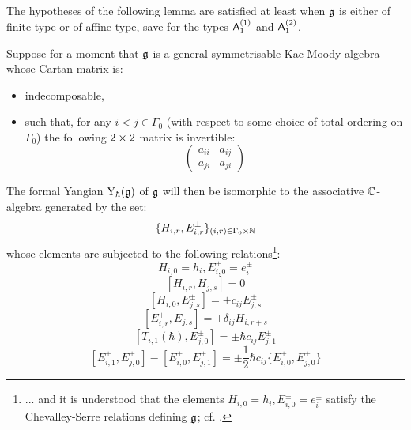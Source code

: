         The hypotheses of the following lemma are satisfied at least when $\mathfrak{g}$ is either of finite type or of affine type, save for the types $\mathsf{A}_1^{(1)}$ and $\mathsf{A}_1^{(2)}$.
        \begin{lemma} \label{lemma: levendorskii_presentation}
            \cite[Theorem 2.13]{guay_nakajima_wendlandt_affine_yangian_coproduct} Suppose for a moment that $\mathfrak{g}$ is a general symmetrisable Kac-Moody algebra whose Cartan matrix is:
            \begin{itemize}
                \item indecomposable,
                \item such that, for any $i < j \in \Gamma_0$ (with respect to some choice of total ordering on $\Gamma_0$) the following $2 \x 2$ matrix is invertible:
                    $$
                        \begin{pmatrix}
                            a_{ii} & a_{ij}
                            \\
                            a_{ji} & a_{ji}
                        \end{pmatrix}
                    $$
            \end{itemize}
            The formal Yangian $\mathrm{Y}_{\hbar}(\mathfrak{g})$ of $\mathfrak{g}$ will then be isomorphic to the associative $\mathbb{C}$-algebra generated by the set:
                $$\{ H_{i, r}, E_{i, r}^{\pm} \}_{(i, r) \in \Gamma_0 \x \N}$$
            whose elements are subjected to the following relations\footnote{... and it is understood that the elements $H_{i, 0} = h_i, E_{i, 0}^{\pm} = e_i^{\pm}$ satisfy the Chevalley-Serre relations defining $\mathfrak{g}$; cf. \cite[Chapter 1]{kac_infinite_dimensional_lie_algebras}.}:
                $$H_{i, 0} = h_i, E_{i, 0}^{\pm} = e_i^{\pm}$$
                $$[ H_{i, r}, H_{j, s} ] = 0$$
                $$[ H_{i, 0}, E_{j, s}^{\pm} ] = \pm c_{ij} E_{j, s}^{\pm}$$
                $$[ E_{i, r}^+, E_{j, s}^- ] = \pm \delta_{ij} H_{i, r + s}$$
                $$\left[ T_{i, 1}(\hbar), E_{j, 0}^{\pm} \right] = \pm \hbar c_{ij} E_{j, 1}^{\pm}$$
                $$[ E_{i, 1}^{\pm}, E_{j, 0}^{\pm} ] - [ E_{i, 0}^{\pm}, E_{j, 1}^{\pm} ] = \pm \frac12 \hbar c_{ij} \{E_{i, 0}^{\pm}, E_{j, 0}^{\pm}\}$$
        \end{lemma}
